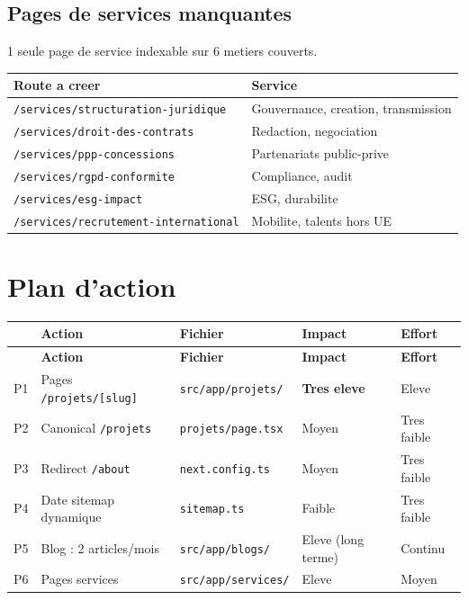 \documentclass[12pt, a4paper]{article}
\newcommand{\f}[1]{\texttt{\small\color{rnjdark}#1}}
\begin{document}
\subsection{Pages de services manquantes}

1 seule page de service indexable sur 6 metiers couverts.

\begin{tabularx}{\linewidth}{lX}
  \toprule
  \textbf{Route a creer} & \textbf{Service} \\
  \midrule
  \f{/services/structuration-juridique} & Gouvernance, creation, transmission \\
  \f{/services/droit-des-contrats} & Redaction, negociation \\
  \f{/services/ppp-concessions} & Partenariats public-prive \\
  \f{/services/rgpd-conformite} & Compliance, audit \\
  \f{/services/esg-impact} & ESG, durabilite \\
  \f{/services/recrutement-international} & Mobilite, talents hors UE \\
  \bottomrule
\end{tabularx}

\section{Plan d'action}

\begin{longtable}{p{0.5cm}p{5.5cm}p{3cm}p{2cm}p{2.2cm}}
  \toprule
  & \textbf{Action} & \textbf{Fichier} & \textbf{Impact} & \textbf{Effort} \\
  \midrule
  \endfirsthead
  \midrule
  & \textbf{Action} & \textbf{Fichier} & \textbf{Impact} & \textbf{Effort} \\
  \midrule
  \endhead
  P1 & Pages \f{/projets/[slug]} & \f{src/app/projets/} & \textcolor{rouge}{\textbf{Tres eleve}} & Eleve \\[4pt]
  P2 & Canonical \f{/projets} & \f{projets/page.tsx} & Moyen & Tres faible \\[4pt]
  P3 & Redirect \f{/about} & \f{next.config.ts} & Moyen & Tres faible \\[4pt]
  P4 & Date sitemap dynamique & \f{sitemap.ts} & Faible & Tres faible \\[4pt]
  P5 & Blog : 2 articles/mois & \f{src/app/blogs/} & Eleve (long terme) & Continu \\[4pt]
  P6 & Pages services & \f{src/app/services/} & Eleve & Moyen \\
  \bottomrule
\end{longtable}
\end{document}

